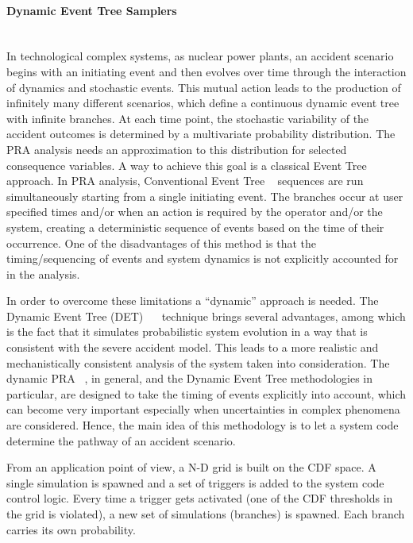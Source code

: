 \paragraph{Dynamic Event Tree Samplers}~\\
In technological complex systems, as nuclear power plants, an accident scenario begins with an initiating event and then evolves over time through the interaction of dynamics and stochastic events. This mutual action leads to the production of infinitely many different scenarios, which define a continuous dynamic event tree with infinite branches. At each time point, the stochastic variability of the accident outcomes is determined by a multivariate probability distribution. The PRA analysis needs an approximation to this distribution for selected consequence variables. A way to achieve this goal is a classical Event Tree approach. In PRA analysis, Conventional Event Tree ~\cite{alfonsiPSA} sequences are run simultaneously starting from a single initiating event. The branches occur at user specified times and/or when an action is required by the operator and/or the system, creating a deterministic sequence of events based on the time of their occurrence. One of the disadvantages of this method is that the timing/sequencing of events and system dynamics is not explicitly accounted for in the analysis. 

In order to overcome these limitations a “dynamic” approach is needed. The Dynamic Event Tree (DET) ~\cite{alfonsiPSA15}~\cite{ANS2014alfADET}  technique brings several advantages, among which is the fact that it simulates probabilistic system evolution in a way that is consistent with the severe accident model. This leads to a more realistic and mechanistically consistent analysis of the system taken into consideration. The dynamic PRA ~\cite{alfonsiPSA}, in general, and the Dynamic Event Tree methodologies in particular, are designed to take the timing of events explicitly into account, which can become very important especially when uncertainties in complex phenomena are considered. Hence, the main idea of this methodology is to let a system code determine the pathway of an accident scenario.

From an application point of view, a N-D grid is built on the CDF space. A single simulation is spawned and a set of triggers is added to the system code control logic. Every time a trigger gets activated (one of the CDF thresholds in the grid is violated), a new set of simulations (branches) is spawned. Each branch carries its own probability. 

